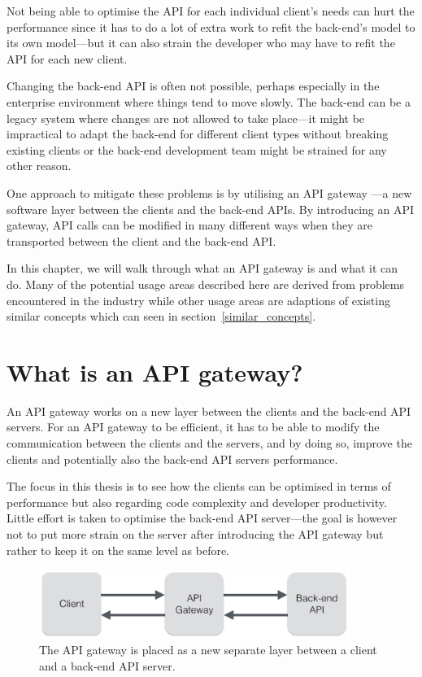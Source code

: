 \documentclass{cslthse-msc}
\begin{document}
Not being able to optimise the API for each individual client's needs can hurt the performance since it has to do a lot of extra work to refit the back-end's model to its own model---but it can also strain the developer who may have to refit the API for each new client.

Changing the back-end API is often not possible, perhaps especially in the enterprise environment where things tend to move slowly. The back-end can be a legacy system where changes are not allowed to take place---it might be impractical to adapt the back-end for different client types without breaking existing clients or the back-end development team might be strained for any other reason.

One approach to mitigate these problems is by utilising an API gateway \cite{api_gateway}---a new software layer between the clients and the back-end APIs. By introducing an API gateway, API calls can be modified in many different ways when they are transported between the client and the back-end API.

In this chapter, we will walk through what an API gateway is and what it can do. Many of the potential usage areas described here are derived from problems encountered in the industry while other usage areas are adaptions of existing similar concepts which can seen in section~\ref{similar_concepts}.

\section{What is an API gateway?}
An API gateway works on a new layer between the clients and the back-end API servers. For an API gateway to be efficient, it has to be able to modify the communication between the clients and the servers, and by doing so, improve the clients and potentially also the back-end API servers performance.

The focus in this thesis is to see how the clients can be optimised in terms of performance but also regarding code complexity and developer productivity. Little effort is taken to optimise the back-end API server---the goal is however not to put more strain on the server after introducing the API gateway but rather to keep it on the same level as before.

\begin{figure}[H]
  \centering
    \begin{center}
      \includegraphics[width=0.9\textwidth]{images/api_gateway.png}
    \end{center}
  \caption{The API gateway is placed as a new separate layer between a client and a back-end API server.}
\end{figure}
\end{document}
